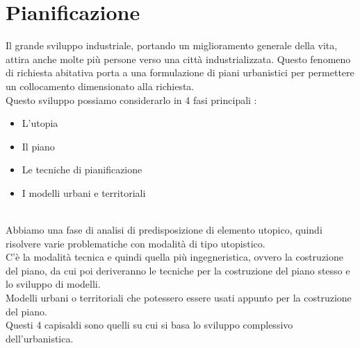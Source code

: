 \documentclass[a4paper,12pt, oneside]{book}
\begin{document}
    \chapter{Pianificazione}
    Il grande sviluppo industriale, portando un miglioramento generale della vita, attira anche molte più persone verso una città industrializzata. Questo fenomeno di richiesta abitativa porta a una formulazione di piani urbanistici per permettere un collocamento dimensionato alla richiesta.\\
    Questo sviluppo possiamo considerarlo in 4 fasi principali : \\
    \begin{itemize}
      \item L'utopia
      \item Il piano
      \item Le tecniche di pianificazione
      \item I modelli urbani e territoriali
    \end{itemize}
    \leavevmode\\
    Abbiamo una fase di analisi di predisposizione di elemento utopico, quindi risolvere varie problematiche con modalità di tipo utopistico.\\
    C'è la modalità tecnica e quindi quella più ingegneristica, ovvero la costruzione del piano, da cui poi deriveranno le tecniche per la costruzione del piano stesso e lo sviluppo di modelli.\\
    Modelli urbani o territoriali che potessero essere usati appunto per la costruzione del piano.\\
    Questi 4 capisaldi sono quelli su cui si basa lo sviluppo complessivo dell'urbanistica.\\
\end{document}
